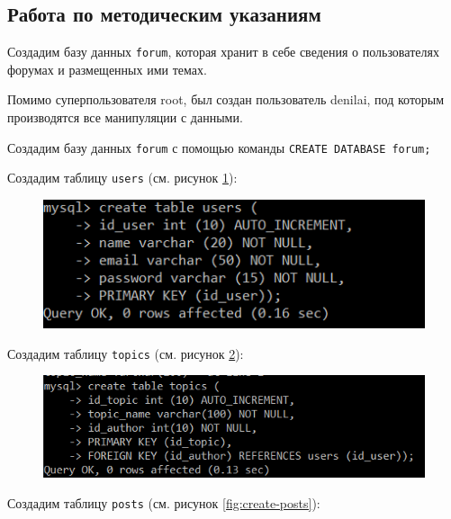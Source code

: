 \documentclass[a4paper,14pt]{extarticle}
\newcommand{\methodsection}{Работа по методическим указаниям~}
\begin{document}
\subsection{\methodsection}
Создадим базу данных \texttt{forum}, которая хранит в себе сведения о пользователях форумах и размещенных ими темах.

Помимо суперпользователя root, был создан пользователь denilai, под которым производятся все манипуляции с данными.

Создадим базу данных \texttt{forum} с помощью команды \texttt{CREATE DATABASE forum;}


Создадим таблицу \texttt{users} (см. рисунок \ref{fig:create-users}):

\begin{figure}[h!]
	\centering
	\includegraphics[width=0.6\linewidth]{images/create-users}
	\caption{}
	\label{fig:create-users}
\end{figure}


Создадим таблицу \texttt{topics} (см. рисунок \ref{fig:create-topics}):

\begin{figure}[h!]
	\centering
	\includegraphics[width=0.6\linewidth]{images/create-topics}
	\caption{}
	\label{fig:create-topics}
\end{figure}

Создадим таблицу \texttt{posts} (см. рисунок \ref{fig:create-posts}):
\end{document}

